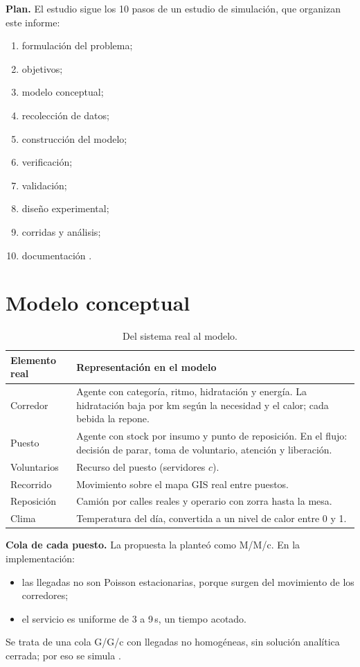 \documentclass[11pt,a4paper]{article}
\begin{document}
\textbf{Plan.} El estudio sigue los 10 pasos de un estudio de simulación, que organizan este informe:
\begin{enumerate}
    \item formulación del problema;
    \item objetivos;
    \item modelo conceptual;
    \item recolección de datos;
    \item construcción del modelo;
    \item verificación;
    \item validación;
    \item diseño experimental;
    \item corridas y análisis;
    \item documentación \cite{lawkelton}.
\end{enumerate}

\section{Modelo conceptual}

\begin{table}[H]
\centering
\small
\begin{tabular}{lP{11.5cm}}
\toprule
\textbf{Elemento real} & \textbf{Representación en el modelo} \\
\midrule
Corredor & Agente con categoría, ritmo, hidratación y energía. La hidratación baja por km según la necesidad y el calor; cada bebida la repone. \\
Puesto & Agente con stock por insumo y punto de reposición. En el flujo: decisión de parar, toma de voluntario, atención y liberación. \\
Voluntarios & Recurso del puesto (servidores $c$). \\
Recorrido & Movimiento sobre el mapa GIS real entre puestos. \\
Reposición & Camión por calles reales y operario con zorra hasta la mesa. \\
Clima & Temperatura del día, convertida a un nivel de calor entre 0 y 1. \\
\bottomrule
\end{tabular}
\caption{Del sistema real al modelo.}
\end{table}

\textbf{Cola de cada puesto.} La propuesta la planteó como M/M/c. En la implementación:
\begin{itemize}
    \item las llegadas no son Poisson estacionarias, porque surgen del movimiento de los corredores;
    \item el servicio es uniforme de 3 a 9\,s, un tiempo acotado.
\end{itemize}
Se trata de una cola G/G/c con llegadas no homogéneas, sin solución analítica cerrada; por eso se simula \cite{winston}.
\end{document}
